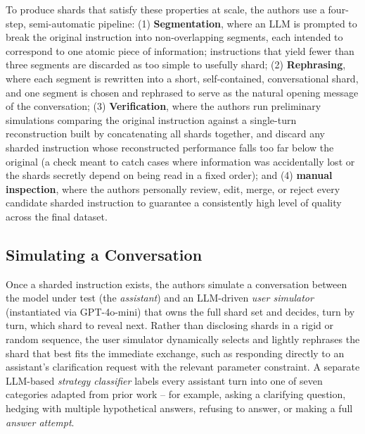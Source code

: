 \documentclass[manuscript,review]{acmart}
\begin{document}
To produce shards that satisfy these properties at scale, the authors use a four-step, semi-automatic pipeline: (1) \textbf{Segmentation}, where an LLM is prompted to break the original instruction into non-overlapping segments, each intended to correspond to one atomic piece of information; instructions that yield fewer than three segments are discarded as too simple to usefully shard; (2) \textbf{Rephrasing}, where each segment is rewritten into a short, self-contained, conversational shard, and one segment is chosen and rephrased to serve as the natural opening message of the conversation; (3) \textbf{Verification}, where the authors run preliminary simulations comparing the original instruction against a single-turn reconstruction built by concatenating all shards together, and discard any sharded instruction whose reconstructed performance falls too far below the original (a check meant to catch cases where information was accidentally lost or the shards secretly depend on being read in a fixed order); and (4) \textbf{manual inspection}, where the authors personally review, edit, merge, or reject every candidate sharded instruction to guarantee a consistently high level of quality across the final dataset.
 


\subsection{Simulating a Conversation}
 
Once a sharded instruction exists, the authors simulate a conversation between the model under test (the \emph{assistant}) and an LLM-driven \emph{user simulator} (instantiated via GPT-4o-mini) that owns the full shard set and decides, turn by turn, which shard to reveal next. Rather than disclosing shards in a rigid or random sequence, the user simulator dynamically selects and lightly rephrases the shard that best fits the immediate exchange, such as responding directly to an assistant's clarification request with the relevant parameter constraint. A separate LLM-based \emph{strategy classifier} labels every assistant turn into one of seven categories adapted from prior work \cite{herlihy2024overcoming} -- for example, asking a clarifying question, hedging with multiple hypothetical answers, refusing to answer, or making a full \emph{answer attempt}. 
\end{document}
